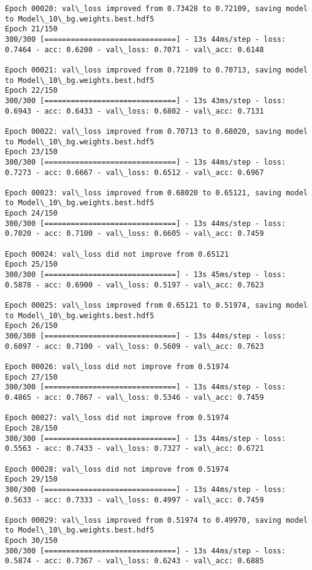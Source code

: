 \documentclass[11pt]{article}
\begin{document}
\begin{Verbatim}[commandchars=\\\{\}]
Epoch 00020: val\_loss improved from 0.73428 to 0.72109, saving model to Model\_10\_bg.weights.best.hdf5
Epoch 21/150
300/300 [==============================] - 13s 44ms/step - loss: 0.7464 - acc: 0.6200 - val\_loss: 0.7071 - val\_acc: 0.6148

Epoch 00021: val\_loss improved from 0.72109 to 0.70713, saving model to Model\_10\_bg.weights.best.hdf5
Epoch 22/150
300/300 [==============================] - 13s 43ms/step - loss: 0.6943 - acc: 0.6433 - val\_loss: 0.6802 - val\_acc: 0.7131

Epoch 00022: val\_loss improved from 0.70713 to 0.68020, saving model to Model\_10\_bg.weights.best.hdf5
Epoch 23/150
300/300 [==============================] - 13s 44ms/step - loss: 0.7273 - acc: 0.6667 - val\_loss: 0.6512 - val\_acc: 0.6967

Epoch 00023: val\_loss improved from 0.68020 to 0.65121, saving model to Model\_10\_bg.weights.best.hdf5
Epoch 24/150
300/300 [==============================] - 13s 44ms/step - loss: 0.7020 - acc: 0.7100 - val\_loss: 0.6605 - val\_acc: 0.7459

Epoch 00024: val\_loss did not improve from 0.65121
Epoch 25/150
300/300 [==============================] - 13s 45ms/step - loss: 0.5878 - acc: 0.6900 - val\_loss: 0.5197 - val\_acc: 0.7623

Epoch 00025: val\_loss improved from 0.65121 to 0.51974, saving model to Model\_10\_bg.weights.best.hdf5
Epoch 26/150
300/300 [==============================] - 13s 44ms/step - loss: 0.6097 - acc: 0.7100 - val\_loss: 0.5609 - val\_acc: 0.7623

Epoch 00026: val\_loss did not improve from 0.51974
Epoch 27/150
300/300 [==============================] - 13s 44ms/step - loss: 0.4865 - acc: 0.7867 - val\_loss: 0.5346 - val\_acc: 0.7459

Epoch 00027: val\_loss did not improve from 0.51974
Epoch 28/150
300/300 [==============================] - 13s 44ms/step - loss: 0.5563 - acc: 0.7433 - val\_loss: 0.7327 - val\_acc: 0.6721

Epoch 00028: val\_loss did not improve from 0.51974
Epoch 29/150
300/300 [==============================] - 13s 44ms/step - loss: 0.5633 - acc: 0.7333 - val\_loss: 0.4997 - val\_acc: 0.7459

Epoch 00029: val\_loss improved from 0.51974 to 0.49970, saving model to Model\_10\_bg.weights.best.hdf5
Epoch 30/150
300/300 [==============================] - 13s 44ms/step - loss: 0.5874 - acc: 0.7367 - val\_loss: 0.6243 - val\_acc: 0.6885


\end{Verbatim}
\end{document}
